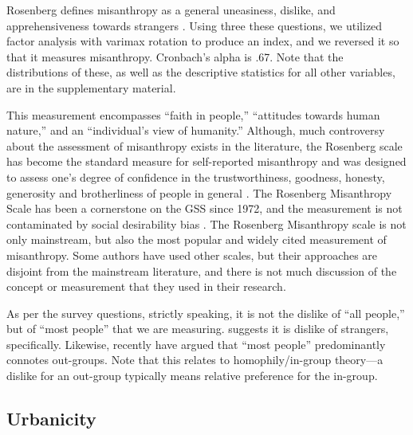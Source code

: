 \documentclass[11pt, letterpaper]{article}
\begin{document}
\begin{spacing}{1.4}
Rosenberg defines misanthropy as a general uneasiness, dislike, and apprehensiveness towards strangers \citep{rosenberg56}. Using three these questions, we utilized factor analysis with varimax rotation to produce an index, and we reversed it so that it measures misanthropy. Cronbach's alpha is .67. Note that the distributions of these, as well as the descriptive statistics for all other variables, are in the supplementary material.

This measurement encompasses ``faith in people,'' ``attitudes towards human nature,'' and an ``individual's view of humanity.'' Although, much controversy about the assessment of misanthropy exists in the literature, the Rosenberg scale has become the standard measure for self-reported misanthropy and was designed to assess one's degree of confidence in the trustworthiness, goodness, honesty, generosity and brotherliness of people in general \citep{rosenberg56}. The Rosenberg Misanthropy Scale has been a cornerstone on the GSS since 1972, and  the measurement is not contaminated by social desirability bias \citep{ray81}. 
The Rosenberg Misanthropy scale is not only mainstream, but also the most popular and widely cited measurement of misanthropy. Some authors   \citep[e.g.,][]{wuensch2002misanthropy} have used other scales, but their approaches are disjoint from the mainstream literature, and there is not much discussion of the concept or measurement that they used in their research.  

As per the survey questions, strictly speaking, it is not the dislike of ``all people,'' but of ``most people''  that we are measuring. \citet{wilson85} suggests it is dislike of strangers, specifically. Likewise, recently \citet{delhey11} have argued that ``most people'' predominantly connotes out-groups. Note that this relates to homophily/in-group theory---a dislike for an out-group typically means relative preference for the in-group. 

 
\subsection*{Urbanicity}


\end{spacing}
\end{document}
